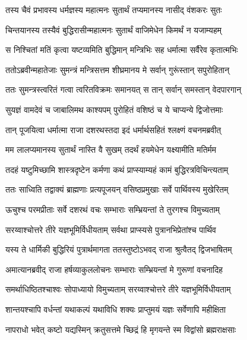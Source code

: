 
\twolineshloka
{तस्य चैवं प्रभावस्य धर्मज्ञस्य महात्मनः}
{सुतार्थं तप्यमानस्य नासीद् वंशकरः सुतः} %

\twolineshloka
{चिन्तयानस्य तस्यैवं बुद्धिरासीन्महात्मनः}
{सुतार्थं वाजिमेधेन किमर्थं न यजाम्यहम्} %

\twolineshloka
{स निश्चितां मतिं कृत्वा यष्टव्यमिति बुद्धिमान्}
{मन्त्रिभिः सह धर्मात्मा सर्वैरेव कृतात्मभिः} %

\twolineshloka
{ततोऽब्रवीन्महातेजाः सुमन्त्रं मन्त्रिसत्तम}
{शीघ्रमानय मे सर्वान् गुरूंस्तान् सपुरोहितान्} %

\twolineshloka
{ततः सुमन्त्रस्त्वरितं गत्वा त्वरितविक्रमः}
{समानयत् स तान् सर्वान् समस्तान् वेदपारगान्} %

\twolineshloka
{सुयज्ञं वामदेवं च जाबालिमथ काश्यपम्}
{पुरोहितं वशिष्ठं च ये चाप्यन्ये द्विजोत्तमाः} %

\twolineshloka
{तान् पूजयित्वा धर्मात्मा राजा दशरथस्तदा}
{इदं धर्मार्थसहितं श्लक्ष्णं वचनमब्रवीत्} %

\twolineshloka
{मम लालप्यमानस्य सुतार्थं नास्ति वै सुखम्}
{तदर्थं हयमेधेन यक्ष्यामीति मतिर्मम} %

\twolineshloka
{तदहं यष्टुमिच्छामि शास्त्रदृष्टेन कर्मणा}
{कथं प्राप्स्याम्यहं कामं बुद्धिरत्रविचिन्त्यताम्} %

\twolineshloka
{ततः साध्विति तद्वाक्यं ब्राह्मणाः प्रत्यपूजयन्}
{वसिष्ठप्रमुखाः सर्वे पार्थिवस्य मुखेरितम्} %

\twolineshloka
{ऊचुश्च परमप्रीताः सर्वे दशरथं वचः}
{सम्भाराः सम्भ्रियन्तां ते तुरगश्च विमुच्यताम्} %

\twolineshloka
{सरय्वाश्चोत्तरे तीरे यज्ञभूमिर्विधीयताम्}
{सर्वथा प्राप्स्यसे पुत्रानभिप्रेतांश्च पार्थिव} %

\twolineshloka
{यस्य ते धार्मिकी बुद्धिरियं पुत्रार्थमागता}
{ततस्तुष्टोऽभवद् राजा श्रुत्वैतद् द्विजभाषितम्} %

\twolineshloka
{अमात्यानब्रवीद् राजा हर्षव्याकुललोचनः}
{सम्भाराः सम्भ्रियन्तां मे गुरूणां वचनादिह} %

\twolineshloka
{समर्थाधिष्ठितश्चाश्वः सोपाध्यायो विमुच्यताम्}
{सरय्वाश्चोत्तरे तीरे यज्ञभूमिर्विधीयताम्} %

\twolineshloka
{शान्तयश्चापि वर्धन्तां यथाकल्पं यथाविधि}
{शक्यः प्राप्तुमयं यज्ञः सर्वेणापि महीक्षिता} %

\twolineshloka
{नापराधो भवेत् कष्टो यद्यस्मिन् क्रतुसत्तमे}
{च्छिद्रं हि मृगयन्ते स्म विद्वांसो ब्रह्मराक्षसाः} %

